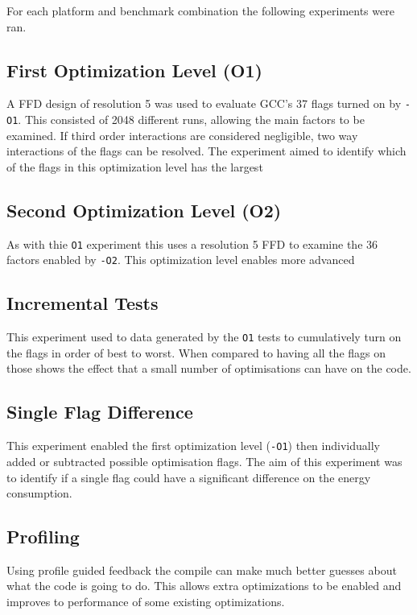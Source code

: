 \documentclass[twocolumn]{article}
\begin{document}
For each platform and benchmark combination the following experiments were ran.

\subsection*{First Optimization Level (O1)}

A FFD design of resolution 5 was used to evaluate GCC's 37 flags turned on by \texttt{-O1}. This consisted of 2048 different runs, allowing the main factors to be examined. If third order interactions are considered negligible, two way interactions of the flags can be resolved. The experiment aimed to identify which of the flags in this optimization level has the largest

\subsection*{Second Optimization Level (O2)}

As with thie \texttt{O1} experiment this uses a resolution 5 FFD to examine the 36 factors enabled by \texttt{-O2}. This optimization level enables more advanced

\subsection*{Incremental Tests}

This experiment used to data generated by the \texttt{O1} tests to cumulatively turn on the flags in order of best to worst. When compared to having all the flags on those shows the effect that a small number of optimisations can have on the code.

\subsection*{Single Flag Difference}

This experiment enabled the first optimization level (\texttt{-O1}) then individually added or subtracted possible optimisation flags. The aim of this experiment was to identify if a single flag could have a significant difference on the energy consumption.

\subsection*{Profiling}

Using profile guided feedback the compile can make much better guesses about what the code is going to do. This allows extra optimizations to be enabled and improves to performance of some existing optimizations.
\end{document}

